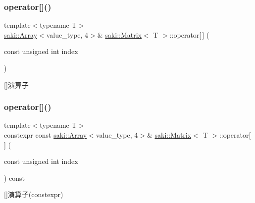 \subsubsection{\texorpdfstring{operator[]()}{operator[]()}\hspace{0.1cm}{\footnotesize\ttfamily [1/2]}}
{\footnotesize\ttfamily template$<$typename T$>$ \\
\mbox{\hyperlink{classsaki_1_1_array}{saki\+::\+Array}}$<$value\+\_\+type, 4$>$\& \mbox{\hyperlink{classsaki_1_1_matrix}{saki\+::\+Matrix}}$<$ T $>$\+::operator\mbox{[}$\,$\mbox{]} (\begin{DoxyParamCaption}\item[{const unsigned int}]{index }\end{DoxyParamCaption})\hspace{0.3cm}{\ttfamily [inline]}}



\mbox{[}\mbox{]}演算子 

\mbox{\label{classsaki_1_1_matrix_aa195ec5ec3b7a385b42072885d796b1d}} 
\subsubsection{\texorpdfstring{operator[]()}{operator[]()}\hspace{0.1cm}{\footnotesize\ttfamily [2/2]}}
{\footnotesize\ttfamily template$<$typename T$>$ \\
constexpr const \mbox{\hyperlink{classsaki_1_1_array}{saki\+::\+Array}}$<$value\+\_\+type, 4$>$\& \mbox{\hyperlink{classsaki_1_1_matrix}{saki\+::\+Matrix}}$<$ T $>$\+::operator\mbox{[}$\,$\mbox{]} (\begin{DoxyParamCaption}\item[{const unsigned int}]{index }\end{DoxyParamCaption}) const\hspace{0.3cm}{\ttfamily [inline]}}



\mbox{[}\mbox{]}演算子(constexpr) 

\mbox{\label{classsaki_1_1_matrix_a78f7166af66941378ae5903bd266d309}} 

